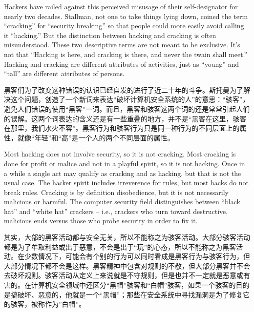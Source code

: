 \ifdefined\eng
Hackers have railed against this perceived misusage of their self-designator for nearly two decades.  Stallman, not one to take things lying down, coined the term ``cracking'' for ``security breaking'' so that people could more easily avoid calling it ``hacking.''  But the distinction between hacking and cracking is often misunderstood. These two descriptive terms are not meant to be exclusive.  It's not that ``Hacking is here, and cracking is there, and never the twain shall meet.''  Hacking and cracking are different attributes of activities, just as ``young'' and ``tall'' are different attributes of persons.
\fi

\ifdefined\chs
黑客们为了改变这种错误的认识已经自发的进行了近二十年的斗争。斯托曼为了解决这个问题，创造了一个新词来表达“破坏计算机安全系统的人”的意思：“骇客”，避免人们错误的使用“黑客”一词。而且，黑客和骇客这两个词的还是常常引起人们的误解。这两个词表达的含义还是有一些重叠的地方，并不是“黑客在这里，骇客在那里，我们水火不容”。黑客行为和骇客行为只是同一种行为的不同层面上的属性，就像“年轻”和“高”是一个人的两个不同层面的属性。
\fi

\ifdefined\eng
Most hacking does not involve security, so it is not cracking.  Most cracking is done for profit or malice and not in a playful spirit, so it is not hacking.  Once in a while a single act may qualify as cracking and as hacking, but that is not the usual case.  The hacker spirit includes irreverence for rules, but most hacks do not break rules.  Cracking is by definition disobedience, but it is not necessarily malicious or harmful.  The computer security field distinguishes between ``black hat'' and ``white hat'' crackers -- i.e., crackers who turn toward destructive, malicious ends versus those who probe security in order to fix it.
\fi

\ifdefined\chs
其实，大部的黑客活动都与安全无关，所以不能称之为骇客活动。大部分骇客活动都是为了牟取利益或出于恶意，不会是出于“玩”的心态，所以不能称之为黑客活动。在少数情况下，可能会有个别的行为可以同时看成是黑客行为与骇客行为，但大部分情况下都不会是这样。黑客精神中包含对规则的不敬，但大部分黑客并不会去破坏规则。骇客活动从定义上来说就是不守规则，但是也并不一定就是恶意或有害的。在计算机安全领域中还区分“黑帽”骇客和“白帽”骇客，如果一个骇客的目的是搞破坏、恶意的，他就是一个“黑帽”；那些在安全系统中寻找漏洞是为了修复它的骇客，被称作为”白帽”。
\fi


